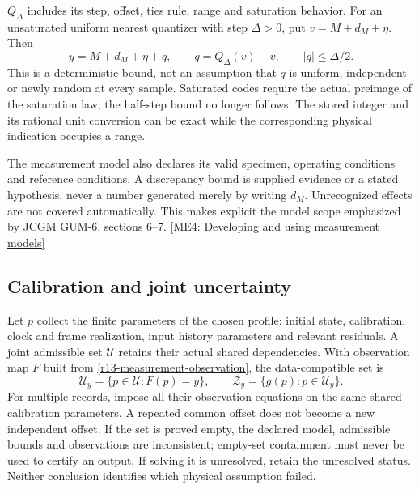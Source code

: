 $Q_{\Delta}$ includes its step, offset, ties rule, range and saturation
behavior. For an unsaturated uniform nearest quantizer with step $\Delta>0$,
put $v=M+d_M+\eta$. Then
\begin{equation}
 y=M+d_M+\eta+q,\qquad q=Q_{\Delta}(v)-v,
 \qquad |q|\leq\Delta/2.
 \label{r13-measurement-quantizer}
\end{equation}
This is a deterministic bound, not an assumption that $q$ is uniform,
independent or newly random at every sample. Saturated codes require the
actual preimage of the saturation law; the half-step bound no longer follows.
The stored integer and its rational unit conversion can be exact while
the corresponding physical indication occupies a range.

The measurement model also declares its valid specimen, operating conditions
and reference conditions. A discrepancy bound is supplied evidence or a
stated hypothesis, never a number generated merely by writing $d_M$.
Unrecognized effects are not covered automatically. This makes explicit the
model scope emphasized by JCGM GUM-6, sections 6--7.
\href{https://doi.org/10.59161/JCGMGUM-6-2020}{[ME4: Developing and using measurement models]}

\subsection{Calibration and joint uncertainty}
\label{r13-measurement-calibration}

Let $p$ collect the finite parameters of the chosen profile: initial state,
calibration, clock and frame realization, input history parameters and relevant
residuals. A joint admissible set $\mathcal U$ retains their actual shared
dependencies. With observation map $F$ built from
\eqref{r13-measurement-observation}, the data-compatible set is
\begin{equation}
 \mathcal U_y=\{p\in\mathcal U:F(p)=y\},\qquad
 \mathcal Z_y=\{g(p):p\in\mathcal U_y\}.
 \label{r13-measurement-feasible}
\end{equation}
For multiple records, impose all their observation equations on the same
shared calibration parameters. A repeated common offset does not become a
new independent offset. If the set is proved empty, the declared model,
admissible bounds and observations are inconsistent; empty-set containment
must never be used to certify an output. If solving it is unresolved, retain
the unresolved status. Neither conclusion identifies which physical
assumption failed.

